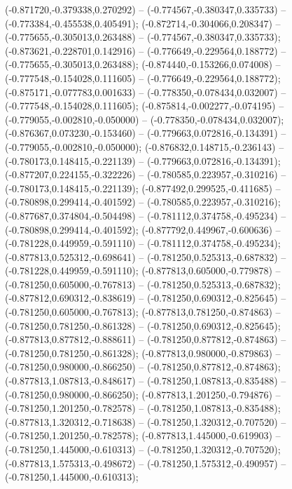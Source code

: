  (-0.871720,-0.379338,0.270292) -- (-0.774567,-0.380347,0.335733) -- (-0.773384,-0.455538,0.405491);
 (-0.872714,-0.304066,0.208347) -- (-0.775655,-0.305013,0.263488) -- (-0.774567,-0.380347,0.335733);
 (-0.873621,-0.228701,0.142916) -- (-0.776649,-0.229564,0.188772) -- (-0.775655,-0.305013,0.263488);
 (-0.874440,-0.153266,0.074008) -- (-0.777548,-0.154028,0.111605) -- (-0.776649,-0.229564,0.188772);
 (-0.875171,-0.077783,0.001633) -- (-0.778350,-0.078434,0.032007) -- (-0.777548,-0.154028,0.111605);
 (-0.875814,-0.002277,-0.074195) -- (-0.779055,-0.002810,-0.050000) -- (-0.778350,-0.078434,0.032007);
 (-0.876367,0.073230,-0.153460) -- (-0.779663,0.072816,-0.134391) -- (-0.779055,-0.002810,-0.050000);
 (-0.876832,0.148715,-0.236143) -- (-0.780173,0.148415,-0.221139) -- (-0.779663,0.072816,-0.134391);
 (-0.877207,0.224155,-0.322226) -- (-0.780585,0.223957,-0.310216) -- (-0.780173,0.148415,-0.221139);
 (-0.877492,0.299525,-0.411685) -- (-0.780898,0.299414,-0.401592) -- (-0.780585,0.223957,-0.310216);
 (-0.877687,0.374804,-0.504498) -- (-0.781112,0.374758,-0.495234) -- (-0.780898,0.299414,-0.401592);
 (-0.877792,0.449967,-0.600636) -- (-0.781228,0.449959,-0.591110) -- (-0.781112,0.374758,-0.495234);
 (-0.877813,0.525312,-0.698641) -- (-0.781250,0.525313,-0.687832) -- (-0.781228,0.449959,-0.591110);
 (-0.877813,0.605000,-0.779878) -- (-0.781250,0.605000,-0.767813) -- (-0.781250,0.525313,-0.687832);
 (-0.877812,0.690312,-0.838619) -- (-0.781250,0.690312,-0.825645) -- (-0.781250,0.605000,-0.767813);
 (-0.877813,0.781250,-0.874863) -- (-0.781250,0.781250,-0.861328) -- (-0.781250,0.690312,-0.825645);
 (-0.877813,0.877812,-0.888611) -- (-0.781250,0.877812,-0.874863) -- (-0.781250,0.781250,-0.861328);
 (-0.877813,0.980000,-0.879863) -- (-0.781250,0.980000,-0.866250) -- (-0.781250,0.877812,-0.874863);
 (-0.877813,1.087813,-0.848617) -- (-0.781250,1.087813,-0.835488) -- (-0.781250,0.980000,-0.866250);
 (-0.877813,1.201250,-0.794876) -- (-0.781250,1.201250,-0.782578) -- (-0.781250,1.087813,-0.835488);
 (-0.877813,1.320312,-0.718638) -- (-0.781250,1.320312,-0.707520) -- (-0.781250,1.201250,-0.782578);
 (-0.877813,1.445000,-0.619903) -- (-0.781250,1.445000,-0.610313) -- (-0.781250,1.320312,-0.707520);
 (-0.877813,1.575313,-0.498672) -- (-0.781250,1.575312,-0.490957) -- (-0.781250,1.445000,-0.610313);
